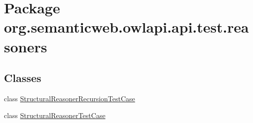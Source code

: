 \hypertarget{namespaceorg_1_1semanticweb_1_1owlapi_1_1api_1_1test_1_1reasoners}{\section{Package org.\-semanticweb.\-owlapi.\-api.\-test.\-reasoners}
\label{namespaceorg_1_1semanticweb_1_1owlapi_1_1api_1_1test_1_1reasoners}
}
\subsection*{Classes}
\begin{DoxyCompactItemize}
\item 
class \hyperlink{classorg_1_1semanticweb_1_1owlapi_1_1api_1_1test_1_1reasoners_1_1_structural_reasoner_recursion_test_case}{Structural\-Reasoner\-Recursion\-Test\-Case}
\item 
class \hyperlink{classorg_1_1semanticweb_1_1owlapi_1_1api_1_1test_1_1reasoners_1_1_structural_reasoner_test_case}{Structural\-Reasoner\-Test\-Case}
\end{DoxyCompactItemize}
